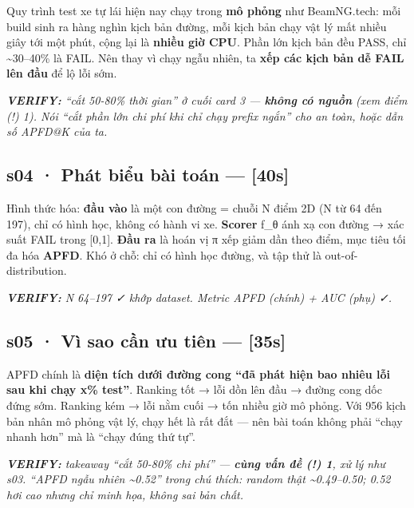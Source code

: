 \documentclass[
  11pt,
]{article}
\renewenvironment{quote}
  {\par\smallskip\noindent
   \def\FrameCommand{{\color{deckorange}\vrule width 2.5pt}\hspace{10pt}}%
   \MakeFramed{\advance\hsize-\width\FrameRestore}%
   \footnotesize\itshape\color{deckslate}}
  {\par\endMakeFramed\smallskip}
\begin{document}
Quy trình test xe tự lái hiện nay chạy trong \textbf{mô phỏng} như
BeamNG.tech: mỗi build sinh ra hàng nghìn kịch bản đường, mỗi kịch bản
chạy vật lý mất nhiều giây tới một phút, cộng lại là \textbf{nhiều giờ
CPU}. Phần lớn kịch bản đều PASS, chỉ \textasciitilde30--40\% là FAIL.
Nên thay vì chạy ngẫu nhiên, ta \textbf{xếp các kịch bản dễ FAIL lên
đầu} để lộ lỗi sớm.

\begin{quote}
\textbf{VERIFY:} ``cắt 50-80\% thời gian'' ở cuối card 3 ---
\textbf{không có nguồn} (xem điểm (!) 1). Nói ``cắt phần lớn chi phí khi
chỉ chạy prefix ngắn'' cho an toàn, hoặc dẫn số APFD@K của ta.
\end{quote}

\subsection{s04 · Phát biểu bài toán ---
{[}40s{]}}\label{s04-phuxe1t-biux1ec3u-buxe0i-touxe1n-40s}

Hình thức hóa: \textbf{đầu vào} là một con đường = chuỗi N điểm 2D (N từ
64 đến 197), chỉ có hình học, không có hành vi xe. \textbf{Scorer} f\_θ
ánh xạ con đường → xác suất FAIL trong {[}0,1{]}. \textbf{Đầu ra} là
hoán vị π xếp giảm dần theo điểm, mục tiêu tối đa hóa \textbf{APFD}. Khó
ở chỗ: chỉ có hình học đường, và tập thử là out-of-distribution.

\begin{quote}
\textbf{VERIFY:} N 64--197 ✓ khớp dataset. Metric APFD (chính) + AUC
(phụ) ✓.
\end{quote}

\subsection{s05 · Vì sao cần ưu tiên ---
{[}35s{]}}\label{s05-vuxec-sao-cux1ea7n-ux1b0u-tiuxean-35s}

APFD chính là \textbf{diện tích dưới đường cong ``đã phát hiện bao nhiêu
lỗi sau khi chạy x\% test''}. Ranking tốt → lỗi dồn lên đầu → đường cong
dốc đứng sớm. Ranking kém → lỗi nằm cuối → tốn nhiều giờ mô phỏng. Với
956 kịch bản nhân mô phỏng vật lý, chạy hết là rất đắt --- nên bài toán
không phải ``chạy nhanh hơn'' mà là ``chạy đúng thứ tự''.

\begin{quote}
\textbf{VERIFY:} takeaway ``cắt 50-80\% chi phí'' --- \textbf{cùng vấn
đề (!) 1}, xử lý như s03. ``APFD ngẫu nhiên \textasciitilde0.52'' trong
chú thích: random thật \textasciitilde0.49--0.50; 0.52 hơi cao nhưng chỉ
minh họa, không sai bản chất.
\end{quote}
\end{document}
